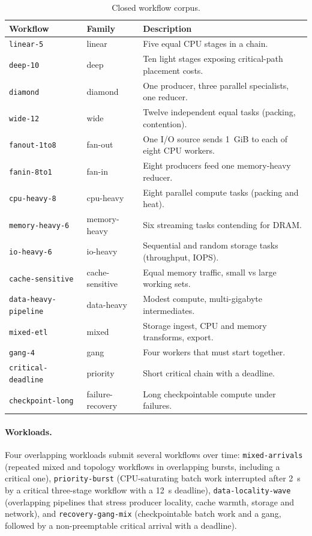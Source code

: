 \documentclass[12pt,a4paper]{report}
\begin{document}
\begin{table}[ht]
\centering
\small
\begin{tabular}{L{3.9cm}L{2.6cm}L{7.1cm}}
\toprule
Workflow & Family & Description \\
\midrule
\texttt{linear-5} & linear & Five equal CPU stages in a chain. \\
\texttt{deep-10} & deep & Ten light stages exposing critical-path placement costs. \\
\texttt{diamond} & diamond & One producer, three parallel specialists, one reducer. \\
\texttt{wide-12} & wide & Twelve independent equal tasks (packing, contention). \\
\texttt{fanout-1to8} & fan-out & One I/O source sends 1~GiB to each of eight CPU workers. \\
\texttt{fanin-8to1} & fan-in & Eight producers feed one memory-heavy reducer. \\
\texttt{cpu-heavy-8} & cpu-heavy & Eight parallel compute tasks (packing and heat). \\
\texttt{memory-heavy-6} & memory-heavy & Six streaming tasks contending for DRAM. \\
\texttt{io-heavy-6} & io-heavy & Sequential and random storage tasks (throughput, IOPS). \\
\texttt{cache-sensitive} & cache-sensitive & Equal memory traffic, small vs large working sets. \\
\texttt{data-heavy-pipeline} & data-heavy & Modest compute, multi-gigabyte intermediates. \\
\texttt{mixed-etl} & mixed & Storage ingest, CPU and memory transforms, export. \\
\texttt{gang-4} & gang & Four workers that must start together. \\
\texttt{critical-deadline} & priority & Short critical chain with a deadline. \\
\texttt{checkpoint-long} & failure-recovery & Long checkpointable compute under failures. \\
\bottomrule
\end{tabular}
\caption{Closed workflow corpus.}
\label{tab:workflows}
\end{table}

\paragraph{Workloads.} Four overlapping workloads submit several workflows
over time: \texttt{mixed-arrivals} (repeated mixed and topology workflows
in overlapping bursts, including a critical one), \texttt{priority-burst}
(CPU-saturating batch work interrupted after 2~s by a critical
three-stage workflow with a 12~s deadline), \texttt{data-locality-wave}
(overlapping pipelines that stress producer locality, cache warmth,
storage and network), and \texttt{recovery-gang-mix} (checkpointable batch
work and a gang, followed by a non-preemptable critical arrival with a
deadline).
\end{document}
